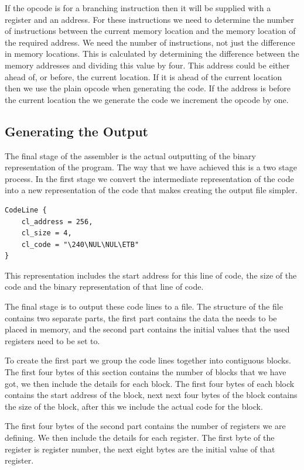 \documentclass[a4paper,11pt]{report}
\begin{document}
If the opcode is for a branching instruction then it will be supplied with a register and an address. For these instructions we need to determine the number of instructions between the current memory location and the memory location of the required address. We need the number of instructions, not just the difference in memory locations. This is calculated by determining the difference between the memory addresses and dividing this value by four. This address could be either ahead of, or before, the current location. If it is ahead of the current location then we use the plain opcode when generating the code. If the address is before the current location the we generate the code we increment the opcode by one.
\clearpage
\subsection{Generating the Output}
The final stage of the assembler is the actual outputting of the binary representation of the program. The way that we have achieved this is a two stage process. In the first stage we convert the intermediate representation of the code into a new representation of the code that makes creating the output file simpler.

\begin{lstlisting}[basicstyle=\ttfamily\small]
CodeLine {
	cl_address = 256, 
	cl_size = 4, 
	cl_code = "\240\NUL\NUL\ETB"
}
\end{lstlisting}

This representation includes the start address for this line of code, the size of the code and the binary representation of that line of code.

The final stage is to output these code lines to a file. The structure of the file contains two separate parts, the first part contains the data the needs to be placed in memory, and the second part contains the initial values that the used registers need to be set to.

To create the first part we group the code lines together into contiguous blocks. The first four bytes of this section contains the number of blocks that we have got, we then include the details for each block. The first four bytes of each block contains the start address of the block, next next four bytes of the block contains the size of the block, after this we include the actual code for the block.

The first four bytes of the second part contains the number of registers we are defining. We then include the details for each register. The first byte of the register is register number, the next eight bytes are the initial value of that register.
\end{document}
